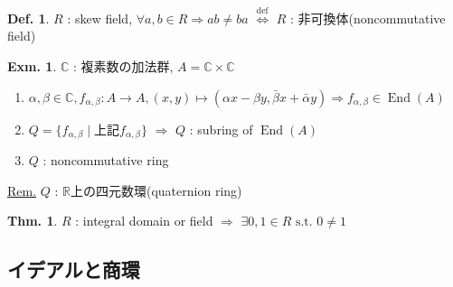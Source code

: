 \documentclass[uplatex,dvipdfmx,9pt]{beamer}
\newcommand{\defarrow}{\overset{\mathrm{def}}{\Leftrightarrow}}
\newcommand{\st}{\text{ s.t. }}
\newcommand{\End}{\operatorname{End}}
\newcommand{\R}{\mathbb{R}}
\newcommand{\C}{\mathbb{C}}
\newcommand{\sscount}{\textsection \thesubsection}
\newcounter{textExmCount}
\theoremstyle{definition} %
\newtheorem{defn}{Def.}[subsection] %
\newtheorem{thm}{Thm.}[subsection] %
\theoremstyle{example}
\newtheorem{exmText}[textExmCount]{Exm.}
\begin{document}
    \begin{frame}

      \begin{defn}
        $R$ : skew field, $\forall a,b \in R \Rightarrow ab \neq ba$ $\defarrow$ $R$ : \alert{非可換体(noncommutative field)}
      \end{defn}

      \begin{exmText}
        $\C$ : 複素数の加法群, $A = \C \times \C$
        \begin{enumerate}
          \item $\alpha, \beta \in \C, f_{\alpha, \beta}\colon A \to A, (x,y) \mapsto (\alpha x - \beta y, \bar{\beta} x + \bar{\alpha} y) \Rightarrow f_{\alpha, \beta} \in \End(A)$
          \item $Q = \{f_{\alpha, \beta} \mid \text{上記$f_{\alpha, \beta}$}\}$ $\Rightarrow$ $Q$ : subring of $\End(A)$
          \item $Q$ : noncommutative ring
        \end{enumerate}
      \end{exmText}
      \underline{Rem.} $Q$ : $\R$上の\alert{四元数環(quaternion ring)}

      \begin{thm}
        $R$ : integral domain or field $\Rightarrow$ $\exists 0, 1 \in R \st 0 \neq 1$
      \end{thm}
      
    \end{frame}

    \subsection{\sscount イデアルと商環}
    \setcounter{textExmCount}{0}
\end{document}
